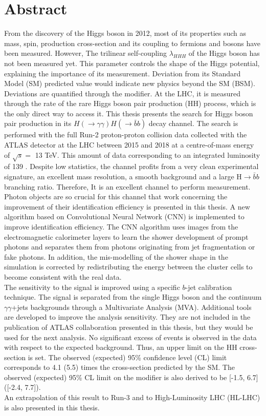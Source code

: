 \newpage
\chapter*{Abstract}
From the discovery of the Higgs boson in 2012, most of its properties such as mass, spin, production cross-section and its coupling to fermions and bosons have been measured. However, The trilinear self-coupling $\lambda_{HHH}$ of the Higgs boson has not been measured yet. This parameter controls the shape of the Higgs potential, explaining the importance of its measurement. Deviation from its Standard Model (SM) predicted value would indicate new physics beyond the SM (BSM). Deviations are quantified through the \kl modifier. At the LHC, it is measured through the rate of the rare Higgs boson pair production (HH) process, which is the only direct way to access it. This thesis presents the search for Higgs boson pair production in its $H(\to\gamma\gamma)H(\to\bar{b}b)$ decay channel. The search is performed with the full Run-2 proton-proton collision data collected with the ATLAS detector at the LHC between 2015 and 2018 at a centre-of-mass energy of $\sqrt{s} = $ 13 TeV. This amount of data corresponding to an integrated luminosity of 139 \ifb. Despite low statistics, the \bbyy channel profits from a very clean experimental signature, an excellent \myy mass resolution, a smooth background and a large H$\to\bar{b}b$ branching ratio. Therefore, It is an excellent channel to perform \kl measurement. \\
Photon objects are so crucial for this channel that work concerning the improvement of their identification efficiency is presented in this thesis. A new algorithm based on Convolutional Neural Network (CNN) is implemented to improve identification efficiency. The CNN algorithm uses images from the electromagnetic calorimeter layers to learn the shower development of prompt photons and separates them from photons originating from jet fragmentation or fake photons. In addition, the mis-modelling of the shower shape in the simulation is corrected by redistributing the energy between the cluster cells to become consistent with the real data. \\
The sensitivity to the \HHyybb signal is improved using a specific $b$-jet calibration technique. The signal is separated from the single Higgs boson and the continuum $\gamma\gamma$+jets backgrounds through a Multivariate Analysis (MVA). Additional tools are developed to improve the analysis sensitivity. They are not included in the publication of ATLAS collaboration presented in this thesis, but they would be used for the next analysis. No significant excess of \HHyybb events is observed in the data with respect to the expected background. Thus, an upper limit on the HH cross-section is set. The observed (expected) 95\% confidence level (CL) limit corresponds to 4.1 (5.5) times the cross-section predicted by the SM. The observed (expected) 95\% CL limit on the \kl modifier is also derived to be [-1.5, 6.7] ([-2.4, 7.7]).  \\
An extrapolation of this result to Run-3 and to High-Luminosity LHC (HL-LHC) is also presented in this thesis.

